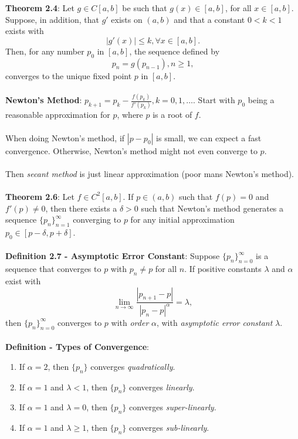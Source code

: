 \documentclass{article}
\begin{document}
\textbf{Theorem 2.4}: Let $g \in C[a, b]$ be such that $g(x) \in [a, b]$, for all $x \in [a, b]$. Suppose, in addition, that $g'$ exists on $(a, b)$ and that a constant $0 < k < 1$ exists with $$|g'(x)| \leq k, \forall x \in [a, b].$$ Then, for any number $p_0$ in $[a, b]$, the sequence defined by $$p_n = g(p_{n - 1}), n \geq 1,$$ converges to the unique fixed point $p$ in $[a, b]$. \\ \\
\textbf{Newton's Method}: $p_{k + 1} = p_k - \frac{f(p_k)}{f'(p_k)}, k = 0, 1, \dots$. Start with $p_0$ being a reasonable approximation for $p$, where $p$ is a root of $f$. \\ \\
When doing Newton's method, if $|p - p_0|$ is small, we can expect a fast convergence. Otherwise, Newton's method might not even converge to $p$. \\ \\
Then \textit{secant method} is just linear approximation (poor mans Newton's method). \\ \\
\textbf{Theorem 2.6}: Let $f \in C^2[a, b]$. If $p \in (a, b)$ such that $f(p) = 0$ and $f'(p) \neq 0$, then there exists a $\delta > 0$ such that Newton's method generates a sequence $\{p_n\}_{n = 1}^\infty$ converging to $p$ for any initial approximation $p_0 \in [p - \delta, p + \delta]$. \\ \\
\textbf{Definition 2.7 - Asymptotic Error Constant}: Suppose $\{p_n\}_{n = 0}^\infty$ is a sequence that converges to $p$ with $p_n \neq p$ for all $n$. If positive constants $\lambda$ and $\alpha$ exist with $$\lim_{n \rightarrow \infty} \frac{|p_{n + 1} - p|}{|p_n - p|^\alpha} = \lambda,$$ then $\{p_n\}_{n = 0}^\infty$ converges to $p$ with \textit{order} $\alpha$, with \textit{asymptotic error constant} $\lambda.$ \\ \\
\textbf{Definition - Types of Convergence}: \begin{enumerate}
    \item If $\alpha = 2$, then $\{p_n\}$ converges \textit{quadratically}.
    \item If $\alpha = 1$ and $\lambda < 1$, then $\{p_n\}$ converges \textit{linearly}.
    \item If $\alpha = 1$ and $\lambda = 0$, then $\{p_n\}$ converges \textit{super-linearly}.
    \item If $\alpha = 1$ and $\lambda \geq 1$, then $\{p_n\}$ converges \textit{sub-linearly}.
\end{enumerate} $ $ \\
\end{document}
